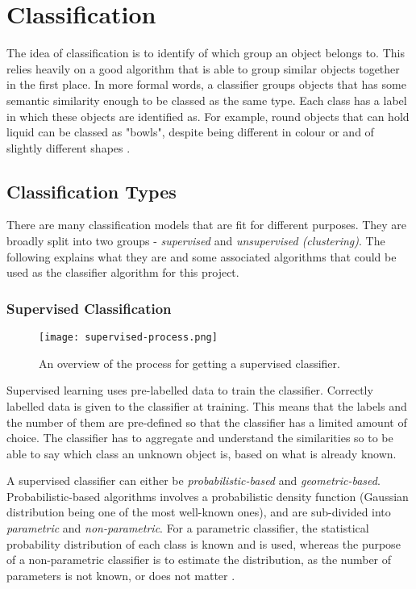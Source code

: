 \newpage

\section{Classification} \label{sec:classification}
The idea of classification is to identify of which group an object belongs to. This relies heavily on a good algorithm that is able to group similar objects together in the first place. In more formal words, a classifier groups objects that has some semantic similarity enough to be classed as the same type. Each class has a label in which these objects are identified as. For example, round objects that can hold liquid can be classed as "bowls", despite being different in colour or and of slightly different shapes \cite{hall-notes}. 


\subsection{Classification Types}
There are many classification models that are fit for different purposes. They are broadly split into two groups - \textit{supervised} and \textit{unsupervised (clustering)}. The following explains what they are and some associated algorithms that could be used as the classifier algorithm for this project.

\subsubsection{Supervised Classification}

\begin{figure}[h]
  \centering\texttt{[image: supervised-process.png]}
  \caption{An overview of the process for getting a supervised classifier. \protect\cite{class-analysis} }
  \label{fig:supervised-process}
\end{figure}
Supervised learning uses pre-labelled data to train the classifier. Correctly labelled data is given to the classifier at training. This means that the labels and the number of them are pre-defined so that the classifier has a limited amount of choice. The classifier has to aggregate and understand the similarities so to be able to say which class an unknown object is, based on what is already known.~\cite{class-analysis} 

A supervised classifier can either be \textit{probabilistic-based} and \textit{geometric-based}. Probabilistic-based algorithms involves a probabilistic density function (Gaussian distribution being one of the most well-known ones), and are sub-divided into \textit{parametric} and \textit{non-parametric}. For a parametric classifier, the statistical probability distribution of each class is known and is used, whereas the purpose of a non-parametric classifier is to estimate the distribution, as the number of parameters is not known, or does not matter \cite{class-analysis} \cite{hall-notes}.


